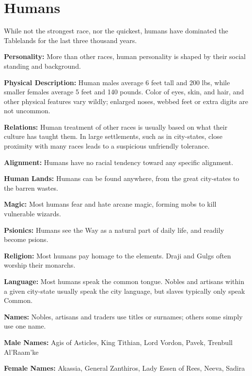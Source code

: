 \section{Humans}

While not the strongest race, nor the quickest, humans have dominated the Tablelands for the last three thousand years.

\textbf{Personality:} More than other races, human personality is shaped by their social standing and background.

\textbf{Physical Description:} Human males average 6 feet tall and 200 lbs, while smaller females average 5 \onehalf feet and 140 pounds. Color of eyes, skin, and hair, and other physical features vary wildly; enlarged noses, webbed feet or extra digits are not uncommon.

\textbf{Relations:} Human treatment of other races is usually based on what their culture has taught them. In large settlements, such as in city-states, close proximity with many races leads to a suspicious unfriendly tolerance.

\textbf{Alignment:} Humans have no racial tendency toward any specific alignment.

\textbf{Human Lands:} Humans can be found anywhere, from the great city-states to the barren wastes.

\textbf{Magic:} Most humans fear and hate arcane magic, forming mobs to kill vulnerable wizards.

\textbf{Psionics:} Humans see the Way as a natural part of daily life, and readily become psions.

\textbf{Religion:} Most humans pay homage to the elements. Draji and Gulgs often worship their monarchs.

\textbf{Language:} Most humans speak the common tongue. Nobles and artisans within a given city-state usually speak the city language, but slaves typically only speak Common.

\textbf{Names:} Nobles, artisans and traders use titles or surnames; others some simply use one name.

\textbf{Male Names:} Agis of Asticles, King Tithian, Lord Vordon, Pavek, Trenbull Al'Raam'ke

\textbf{Female Names:} Akassia, General Zanthiros, Lady Essen of Rees, Neeva, Sadira


